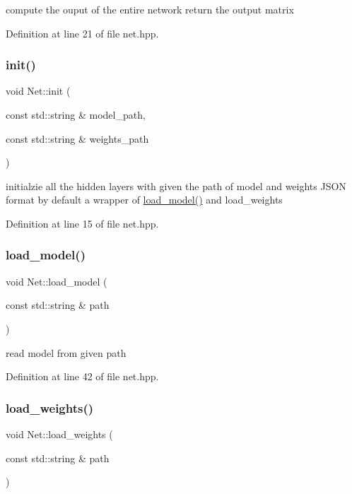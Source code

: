 compute the ouput of the entire network return the output matrix 

Definition at line 21 of file net.\+hpp.

\mbox{\label{class_net_a06cad1a8b674f37f82b9c818c5a2845d}} 
\subsubsection{\texorpdfstring{init()}{init()}}
{\footnotesize\ttfamily void Net\+::init (\begin{DoxyParamCaption}\item[{const std\+::string \&}]{model\+\_\+path,  }\item[{const std\+::string \&}]{weights\+\_\+path }\end{DoxyParamCaption})}

initialzie all the hidden layers with given the path of model and weights J\+S\+ON format by default a wrapper of \hyperlink{class_net_a1ff26f5a15009acc7e093a27a076b374}{load\+\_\+model()} and load\+\_\+weights 

Definition at line 15 of file net.\+hpp.

\mbox{\label{class_net_a1ff26f5a15009acc7e093a27a076b374}} 
\subsubsection{\texorpdfstring{load\+\_\+model()}{load\_model()}}
{\footnotesize\ttfamily void Net\+::load\+\_\+model (\begin{DoxyParamCaption}\item[{const std\+::string \&}]{path }\end{DoxyParamCaption})}



read model from given path 



Definition at line 42 of file net.\+hpp.

\mbox{\label{class_net_a1d6d76c2c860f5dde0438b65d3b60d2e}} 
\subsubsection{\texorpdfstring{load\+\_\+weights()}{load\_weights()}}
{\footnotesize\ttfamily void Net\+::load\+\_\+weights (\begin{DoxyParamCaption}\item[{const std\+::string \&}]{path }\end{DoxyParamCaption})}




